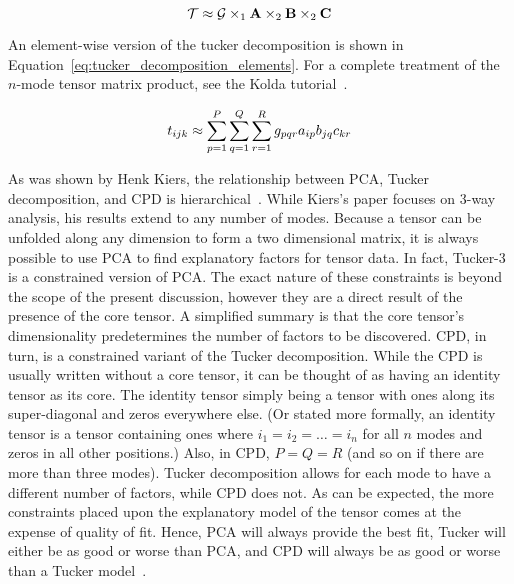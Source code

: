 \documentclass[../dissertation.tex]{subfiles}
\begin{document}
\begin{equation}\label{eq:tucker_decomposition}
  \mathcal{T} \approx \mathcal{G} \times_1 \mathrm{\bf A} \times_2 \mathrm{\bf B} \times_2
  \mathrm{\bf C}
\end{equation}

An element-wise version of the tucker decomposition is shown in
Equation~\ref{eq:tucker_decomposition_elements}.  For a complete
treatment of the $n$-mode tensor matrix product, see the Kolda
tutorial~\cite{kolda2009}.

\begin{equation}\label{eq:tucker_decomposition_elements}
  t_{ijk} \approx \displaystyle\sum_{p=1}^P \displaystyle\sum_{q=1}^Q \displaystyle\sum_{r=1}^R
  g_{pqr}a_{ip}b_{jq}c_{kr}
\end{equation}

As was shown by Henk Kiers, the relationship between PCA, Tucker
decomposition, and CPD is hierarchical~\cite{kiers1991}.  While
Kiers's paper focuses on 3-way analysis, his results extend to any
number of modes.  Because a tensor can be unfolded along any dimension
to form a two dimensional matrix, it is always possible to use PCA to
find explanatory factors for tensor data.  In fact, Tucker-3 is a
constrained version of PCA.  The exact nature of these constraints is
beyond the scope of the present discussion, however they are a direct
result of the presence of the core tensor.  A simplified summary is
that the core tensor's dimensionality predetermines the number of
factors to be discovered.  CPD, in turn, is a constrained variant of
the Tucker decomposition.  While the CPD is usually written without a
core tensor, it can be thought of as having an identity tensor as its
core.  The identity tensor simply being a tensor with ones along its
super-diagonal and zeros everywhere else.  (Or stated more formally,
an identity tensor is a tensor containing ones where $i_1 = i_2 =
\ldots =i_n$ for all $n$ modes and zeros in all other positions.)
Also, in CPD, $P=Q=R$ (and so on if there are more than three modes).
Tucker decomposition allows for each mode to have a different number
of factors, while CPD does not.  As can be expected, the more
constraints placed upon the explanatory model of the tensor comes at
the expense of quality of fit.  Hence, PCA will always provide the
best fit, Tucker will either be as good or worse than PCA, and CPD
will always be as good or worse than a Tucker model~\cite{kiers1991,
  bro1997}.
\end{document}
